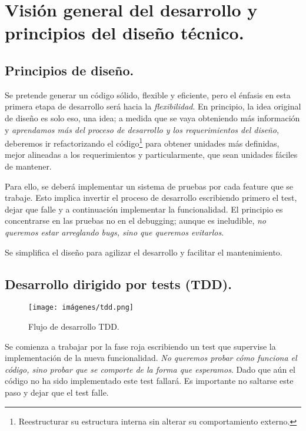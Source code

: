 
\section{Visión general del desarrollo y principios del diseño técnico.}\label{principios:vision-general-desarrollo}

\subsection{Principios de diseño.}\label{principios:principios-de-diseno}
Se pretende generar un código sólido, flexible y eficiente, pero el énfasis en esta primera etapa de desarrollo será hacia la \emph{flexibilidad}. En principio, la idea original de diseño es solo eso, una idea; a medida que se vaya obteniendo más información y \emph{aprendamos más del proceso de desarrollo y los requerimientos del diseño}, deberemos ir refactorizando el código\footnote{Reestructurar su estructura interna sin alterar su comportamiento externo.} para obtener unidades más definidas, mejor alineadas a los requerimientos y particularmente, que sean unidades fáciles de mantener.

Para ello, se deberá implementar un sistema de pruebas por cada feature que se trabaje. Esto implica invertir el proceso de desarrollo escribiendo primero el test, dejar que falle y a continuación implementar la funcionalidad. El principio es concentrarse en las pruebas no en el \foreignlanguage{english}{debugging}; aunque es ineludible, \emph{no queremos estar arreglando bugs, sino que queremos evitarlos}.

Se simplifica el diseño para agilizar el desarrollo y facilitar el mantenimiento.

\subsection{Desarrollo dirigido por tests (TDD).}\label{principios:TDD}

\begin{figure}[ht]
	\centering
	\texttt{[image: imágenes/tdd.png]}
	\caption{Flujo de desarrollo TDD.}
\end{figure}

Se comienza a trabajar por la fase roja escribiendo un test que supervise la implementación de la nueva funcionalidad. \emph{No queremos probar cómo funciona el código, sino probar que se comporte de la forma que esperamos}. Dado que aún el código no ha sido implementado este test fallará. Es importante no saltarse este paso y dejar que el test falle.

